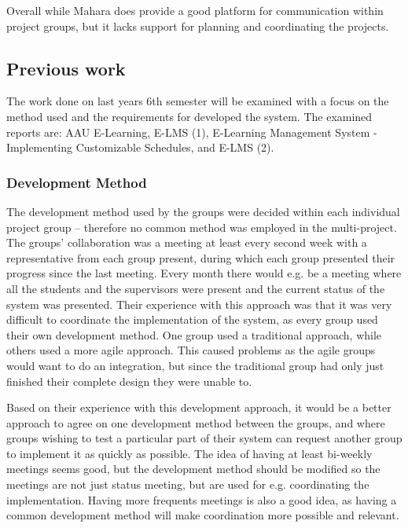 Overall while Mahara does provide a good platform for communication within project groups, but it lacks support for planning and coordinating the projects.

\subsection{Previous work}
The work done on last years 6th semester will be examined with a focus on the method used and the requirements for developed the system. 
The examined reports are: AAU E-Learning, E-LMS (1), E-Learning Management System - Implementing Customizable Schedules, and E-LMS (2).

\subsubsection{Development Method}
The development method used by the groups were decided within each individual project group -- therefore no common method was employed in the multi-project.
The groups' collaboration was a meeting at least every second week with a representative from each group present, during which each group presented their progress since the last meeting.
Every month there would	e.g. be a meeting where all the students and the supervisors were present and the current status of the system was presented.
Their experience with this approach was that it was very difficult to coordinate the implementation of the system, as every group used their own development method. 
One group used a traditional approach, while others used a more agile approach.
This caused problems as the agile groups would want to do an integration, but since the traditional group had only just finished their complete design they were unable to.

Based on their experience with this development approach, it would be a better approach to agree on one development method between the groups, and where groups wishing to test a particular part of their system can request another group to implement it as quickly as possible.
The idea of having at least bi-weekly meetings seems good, but the development method should be modified so the meetings are not just status meeting, but are used for e.g. coordinating the implementation.
Having more frequents meetings is also a good idea, as having a common development method will make coordination more possible and relevant.


